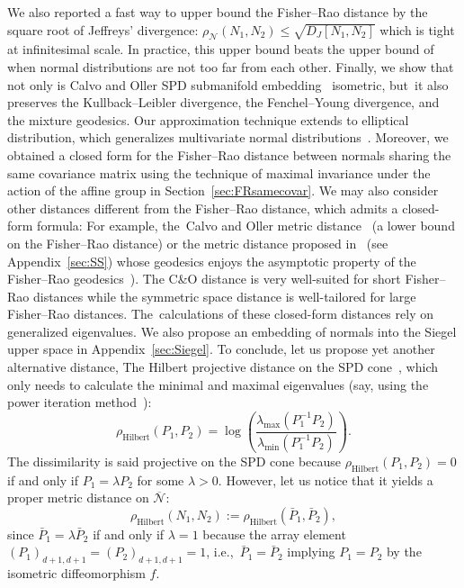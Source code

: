 \documentclass[entropy,article,accept,oneauthor,pdftex,entropy]{Definitions/mdpi}
\def\Hilbert{\mathrm{Hilbert}}
\def\barN{{\overline{\mathcal{N}}}}
\def\calN{\mathcal{N}}
\def\barP{{\bar P}}
\begin{document}
We also reported a fast way to upper bound the Fisher--Rao distance by the square root of Jeffreys' divergence: $\rho_\calN(N_1,N_2)\leq \sqrt{D_J[N_1,N_2]}$ which is tight at infinitesimal scale.
In practice, this upper bound beats the upper bound of~\cite{strapasson2015bounds} when normal distributions are not too far from each other. 
Finally, we show that not only is
Calvo and Oller  SPD submanifold embedding~\cite{SDPMVN-1990} isometric, but~it also preserves the Kullback–Leibler divergence, the Fenchel–Young divergence, and the mixture geodesics. 
Our approximation technique extends to elliptical distribution, which generalizes multivariate normal distributions~\cite{SDPElliptical-2002,chen2022multisensor}.
Moreover, we obtained a closed form for the Fisher–Rao distance between normals sharing the same covariance matrix using the technique of maximal invariance under the action of the affine group in Section~\ref{sec:FRsamecovar}.
We may also consider other distances different from the Fisher--Rao distance, which admits a closed-form formula:
For example, the~Calvo and Oller metric distance~\cite{SDPMVN-1990} (a lower bound on the Fisher–Rao distance) or the metric distance proposed in~\cite{lovric2000multivariate} (see Appendix~\ref{sec:SS}) whose geodesics enjoys the asymptotic property of the Fisher--Rao geodesics~\cite{globke2021information}). 
The C\&O distance is very well-suited for short Fisher--Rao distances while the symmetric space distance is well-tailored for 
large Fisher–Rao distances. The~calculations of these closed-form distances rely on generalized eigenvalues.
We also propose an embedding of normals into the Siegel upper space in Appendix~\ref{sec:Siegel}.
To conclude, let us propose yet another alternative distance, The Hilbert projective distance on the SPD cone~\cite{nielsen2019clustering}, which only needs to calculate the minimal and maximal eigenvalues (say, using the power iteration method~\cite{journee2010generalized}):
\begin{equation}
\rho_\Hilbert(P_1,P_2)= \log\left(\frac{\lambda_{\mathrm{max}}(P_1^{-1}P_2)}{\lambda_{\mathrm{min}}(P_1^{-1}P_2)}\right).
\end{equation}
The dissimilarity is said projective on the SPD cone because $\rho_\Hilbert(P_1,P_2)=0$ if and only if $P_1=\lambda P_2$ for some $\lambda>0$.
However, let us notice that it yields a proper metric distance on $\barN$:
$$
\rho_\Hilbert(N_1,N_2):=\rho_\Hilbert(\barP_1,\barP_2),
$$
since $\barP_1=\lambda\barP_2$ if and only if $\lambda=1$ because the array element $(P_1)_{d+1,d+1}=(P_2)_{d+1,d+1}=1$, i.e.,~$\barP_1=\barP_2$ implying  $P_1=P_2$ by the isometric diffeomorphism $f$.
\end{document}
